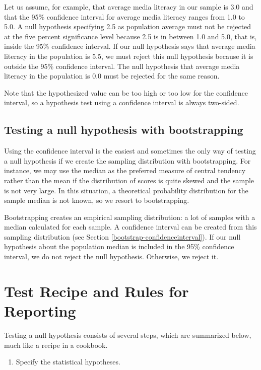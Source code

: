 \documentclass[a4paper]{book}
\providecommand{\tightlist}{%
  \setlength{\itemsep}{0pt}\setlength{\parskip}{0pt}}
\theoremstyle{definition}
\theoremstyle{definition}
\theoremstyle{definition}
\theoremstyle{remark}
\begin{document}
Let us assume, for example, that average media literacy in our sample is
3.0 and that the 95\% confidence interval for average media literacy
ranges from 1.0 to 5.0. A null hypothesis specifying 2.5 as population
average must not be rejected at the five percent significance level
because 2.5 is in between 1.0 and 5.0, that is, inside the 95\%
confidence interval. If our null hypothesis says that average media
literacy in the population is 5.5, we must reject this null hypothesis
because it is outside the 95\% confidence interval. The null hypothesis
that average media literacy in the population is 0.0 must be rejected
for the same reason.

Note that the hypothesized value can be too high or too low for the
confidence interval, so a hypothesis test using a confidence interval is
always two-sided.

\subsection{Testing a null hypothesis with
bootstrapping}\label{testing-a-null-hypothesis-with-bootstrapping}

Using the confidence interval is the easiest and sometimes the only way
of testing a null hypothesis if we create the sampling distribution with
bootstrapping. For instance, we may use the median as the preferred
measure of central tendency rather than the mean if the distribution of
scores is quite skewed and the sample is not very large. In this
situation, a theoretical probability distribution for the sample median
is not known, so we resort to bootstrapping.

Bootstrapping creates an empirical sampling distribution: a lot of
samples with a median calculated for each sample. A confidence interval
can be created from this sampling distribution (see Section
\ref{bootstrap-confidenceinterval}). If our null hypothesis about the
population median is included in the 95\% confidence interval, we do not
reject the null hypothesis. Otherwise, we reject it.

\section{Test Recipe and Rules for
Reporting}\label{test-recipe-and-rules-for-reporting}

Testing a null hypothesis consists of several steps, which are
summarized below, much like a recipe in a cookbook.

\begin{enumerate}
\def\labelenumi{\arabic{enumi}.}
\tightlist
\item
  Specify the statistical hypotheses.
\end{enumerate}
\end{document}
